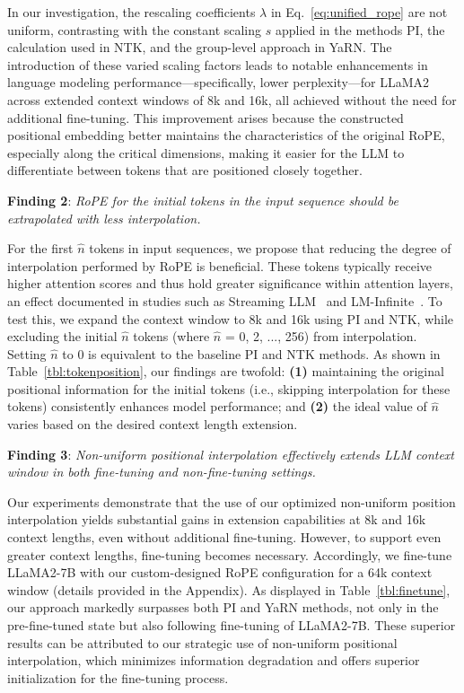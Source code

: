 In our investigation, the rescaling coefficients $\lambda$ in Eq.~\ref{eq:unified_rope} are not uniform, contrasting with the constant scaling $s$ applied in the methods PI, the calculation used in NTK, and the group-level approach in YaRN. The introduction of these varied scaling factors leads to notable enhancements in language modeling performance—specifically, lower perplexity—for LLaMA2 across extended context windows of 8k and 16k, all achieved without the need for additional fine-tuning. This improvement arises because the constructed positional embedding better maintains the characteristics of the original RoPE, especially along the critical dimensions, making it easier for the LLM to differentiate between tokens that are positioned closely together.

\textbf{Finding 2}: \textit{RoPE for the initial tokens in the input sequence should be extrapolated with less interpolation.} 

For the first $\hat{n}$ tokens in input sequences, we propose that reducing the degree of interpolation performed by RoPE is beneficial. These tokens typically receive higher attention scores and thus hold greater significance within attention layers, an effect documented in studies such as Streaming LLM~\cite{streamingllm} and LM-Infinite~\cite{han2023lminfinite}. To test this, we expand the context window to 8k and 16k using PI and NTK, while excluding the initial $\hat n$ tokens (where $\hat n$ = 0, 2, ..., 256) from interpolation. Setting $\hat n$ to 0 is equivalent to the baseline PI and NTK methods. As shown in Table~\ref{tbl:tokenposition}, our findings are twofold: \textbf{(1)} maintaining the original positional information for the initial tokens (i.e., skipping interpolation for these tokens) consistently enhances model performance; and \textbf{(2)} the ideal value of $\hat n$ varies based on the desired context length extension.

\textbf{Finding 3}: \textit{Non-uniform positional interpolation effectively extends LLM context window in both fine-tuning and non-fine-tuning settings.} 

Our experiments demonstrate that the use of our optimized non-uniform position interpolation yields substantial gains in extension capabilities at 8k and 16k context lengths, even without additional fine-tuning. However, to support even greater context lengths, fine-tuning becomes necessary. Accordingly, we fine-tune LLaMA2-7B with our custom-designed RoPE configuration for a 64k context window (details provided in the Appendix). As displayed in Table~\ref{tbl:finetune}, our approach markedly surpasses both PI and YaRN methods, not only in the pre-fine-tuned state but also following fine-tuning of LLaMA2-7B. These superior results can be attributed to our strategic use of non-uniform positional interpolation, which minimizes information degradation and offers superior initialization for the fine-tuning process.


